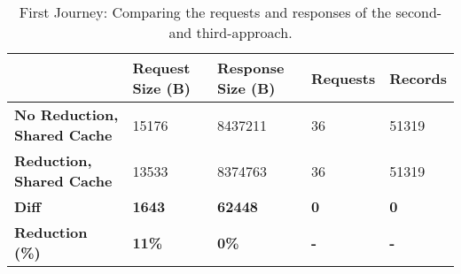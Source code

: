 \ifshowTables
\begin{table}[H]
  \begin{tabular}{|l|l|l|l|l|}
  \hline
  & \textbf{Request Size (B)} & \textbf{Response Size (B)} & \textbf{Requests} & \textbf{Records} \\
  \hline
  \textbf{No Reduction, Shared Cache} & 15176 &  8437211 & 36 & 51319 \\
  \hline
  \textbf{Reduction, Shared Cache} &  13533 &  8374763 & 36 & 51319 \\
  \hline
  \hline
  \textbf{Diff} & \textbf{1643} & \textbf{62448} & \textbf{0} & \textbf{0} \\
  \hline
  \textbf{Reduction (\%)} & \textbf{11\%} & \textbf{0\%} & \textbf{-} & \textbf{-} \\
  \hline
  \end{tabular}
  \caption{First Journey: Comparing the requests and responses of the second- and third-approach.}\label{table:results:size-comparison-first-path-cache-no-reduction-cache-reduction}
\end{table}
\fi
